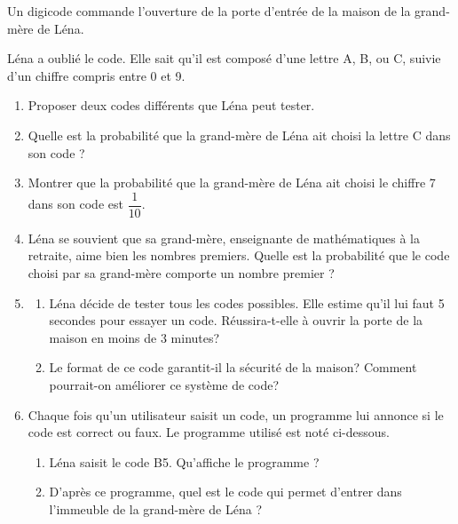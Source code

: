 \documentclass[exercice,a4]{thedocument}%
\begin{document}
%
\medskip

Un digicode commande l'ouverture de la porte d'entrée de la maison de la grand-mère de Léna.

Léna a oublié le code. Elle sait qu'il est composé d'une lettre A, B, ou C, suivie d'un chiffre compris entre 0 et 9.

\medskip

\begin{enumerate}
\item Proposer deux codes différents que Léna peut tester.
\item Quelle est la probabilité que la grand-mère de Léna ait choisi la lettre C dans son code ?
\item Montrer que la probabilité que la grand-mère de Léna ait choisi le chiffre 7 dans son code est $\dfrac{1}{10}$.
\item Léna se souvient que sa grand-mère, enseignante de mathématiques à la retraite, aime bien les nombres premiers. Quelle est la probabilité que le code choisi par sa grand-mère comporte un nombre premier ?
\item 
	\begin{enumerate}
		\item Léna décide de tester tous les codes possibles. Elle estime qu'il lui faut 5 secondes pour essayer un code. Réussira-t-elle à ouvrir la porte de la maison en moins de 3 minutes?
		\item Le format de ce code garantit-il la sécurité de la maison? Comment pourrait-on améliorer ce système de code?
	\end{enumerate}
\item Chaque fois qu'un utilisateur saisit un code, un programme lui annonce si le code est correct ou faux. Le programme utilisé est noté ci-dessous.

\begin{center}
\begin{scratch}
{}
{}
\end{scratch}
\end{center}

	\begin{enumerate}
		\item Léna saisit le code B5. Qu'affiche le programme ?
		\item D'après ce programme, quel est le code qui permet d'entrer dans l'immeuble de la grand-mère
de Léna ?
	\end{enumerate}
\end{enumerate}
\showthesource
\end{document}
